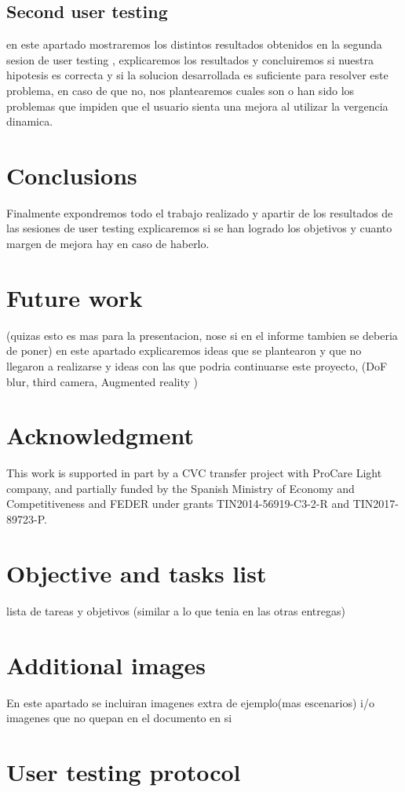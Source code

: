 \documentclass[10pt,a4paper,twocolumn,twoside]{article}
\begin{document}
	\subsection{Second user testing}
	en este apartado mostraremos los distintos resultados obtenidos en la segunda sesion de user testing , explicaremos los resultados y concluiremos si nuestra hipotesis es correcta y si la solucion desarrollada es suficiente para resolver este problema, en caso de que no, nos plantearemos cuales son o han sido los problemas que impiden que el usuario sienta una mejora al utilizar la vergencia dinamica.
	
	\section{Conclusions}
	Finalmente expondremos todo el trabajo realizado y apartir de los resultados de las sesiones de user testing explicaremos si se han logrado los objetivos y cuanto margen de mejora hay en caso de haberlo. 
	
	\section{Future work}
	(quizas esto es mas para la presentacion, nose si en el informe tambien se deberia de poner)
	en este apartado explicaremos ideas que se plantearon y que no llegaron a realizarse y ideas con las que podria continuarse este proyecto, (DoF blur, third camera, Augmented reality )
	
	\section*{Acknowledgment}
	This work is supported in part by a CVC transfer project with ProCare Light company, and partially funded by the Spanish Ministry of Economy and Competitiveness and FEDER under grants TIN2014-56919-C3-2-R and TIN2017-89723-P.
	
	
	
	
	\appendix
	
	\section{Objective and tasks list}
	lista de tareas y objetivos (similar a lo que tenia en las otras entregas)
	
	\section{Additional images}
	En este apartado se incluiran imagenes extra de ejemplo(mas escenarios) i/o imagenes que no quepan en el documento en si

	\section{User testing protocol}
\end{document}

